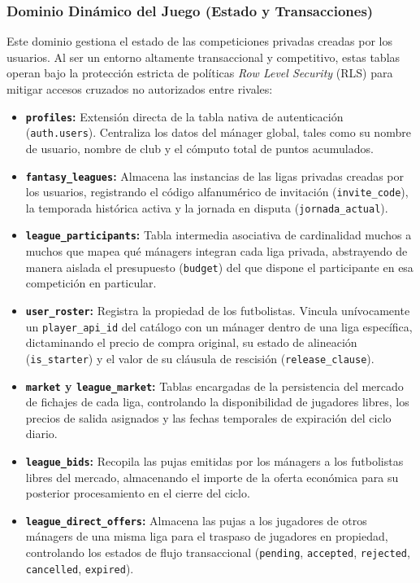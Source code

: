 \subsubsection{Dominio Dinámico del Juego (Estado y Transacciones)}
Este dominio gestiona el estado de las competiciones privadas creadas por los usuarios. Al ser un entorno altamente transaccional y competitivo, estas tablas operan bajo la protección estricta de políticas \textit{Row Level Security} (RLS) para mitigar accesos cruzados no autorizados entre rivales:

\begin{itemize}
    \item \textbf{\texttt{profiles}:} Extensión directa de la tabla nativa de autenticación (\texttt{auth.users}). Centraliza los datos del mánager global, tales como su nombre de usuario, nombre de club y el cómputo total de puntos acumulados.
    \item \textbf{\texttt{fantasy\_leagues}:} Almacena las instancias de las ligas privadas creadas por los usuarios, registrando el código alfanumérico de invitación (\texttt{invite\_code}), la temporada histórica activa y la jornada en disputa (\texttt{jornada\_actual}).
    \item \textbf{\texttt{league\_participants}:} Tabla intermedia asociativa de cardinalidad muchos a muchos que mapea qué mánagers integran cada liga privada, abstrayendo de manera aislada el presupuesto (\texttt{budget}) del que dispone el participante en esa competición en particular.
    \item \textbf{\texttt{user\_roster}:} Registra la propiedad de los futbolistas. Vincula unívocamente un \texttt{player\_api\_id} del catálogo con un mánager dentro de una liga específica, dictaminando el precio de compra original, su estado de alineación (\texttt{is\_starter}) y el valor de su cláusula de rescisión (\texttt{release\_clause}).
    \item \textbf{\texttt{market} y \texttt{league\_market}:} Tablas encargadas de la persistencia del mercado de fichajes de cada liga, controlando la disponibilidad de jugadores libres, los precios de salida asignados y las fechas temporales de expiración del ciclo diario.
    \item \textbf{\texttt{league\_bids}:} Recopila las pujas emitidas por los mánagers a los futbolistas libres del mercado, almacenando el importe de la oferta económica para su posterior procesamiento en el cierre del ciclo.
    \item \textbf{\texttt{league\_direct\_offers}:} Almacena las pujas a los jugadores de otros mánagers de una misma liga para el traspaso de jugadores en propiedad, controlando los estados de flujo transaccional (\texttt{pending}, \texttt{accepted}, \texttt{rejected}, \texttt{cancelled}, \texttt{expired}).

\end{itemize}
